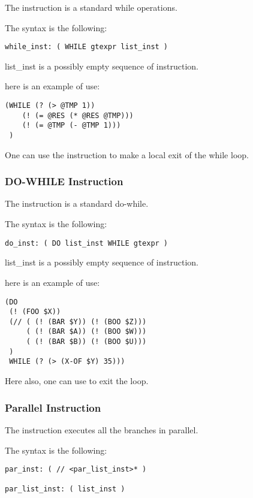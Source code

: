 The  instruction is a standard while operations.

The syntax is the following:
\begin{verbatim}
while_inst: ( WHILE gtexpr list_inst )
\end{verbatim}

list\_inst is a possibly empty sequence of instruction.

here is an example of use:
\begin{verbatim}
(WHILE (? (> @TMP 1))
    (! (= @RES (* @RES @TMP)))
    (! (= @TMP (- @TMP 1)))
 )
\end{verbatim}

One can use the  instruction to make a local exit of the while
loop.

\subsubsection{DO-WHILE Instruction}

The  instruction is a standard do-while.

The syntax is the following:
\begin{verbatim}
do_inst: ( DO list_inst WHILE gtexpr )
\end{verbatim}

list\_inst is a possibly empty sequence of instruction.

here is an example of use:
\begin{verbatim}
(DO 
 (! (FOO $X))
 (// ( (! (BAR $Y)) (! (BOO $Z)))
     ( (! (BAR $A)) (! (BOO $W)))
     ( (! (BAR $B)) (! (BOO $U)))
 )
 WHILE (? (> (X-OF $Y) 35)))
\end{verbatim}

Here also, one can use  to exit the loop.

\subsubsection{Parallel Instruction}

The \code{//} instruction executes all the branches in parallel.

The syntax is the following:
\begin{verbatim}
par_inst: ( // <par_list_inst>* )

par_list_inst: ( list_inst )
\end{verbatim}

